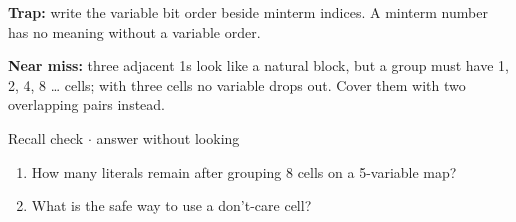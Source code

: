 \documentclass[11pt]{article}
\begin{document}
\begin{keepsection}
\begin{notebox}\textbf{Trap:} write the variable bit order beside minterm indices. A minterm number has no meaning without a variable order.\end{notebox}

\begin{notebox}\textbf{Near miss:} three adjacent 1s look like a natural block, but a group must have 1, 2, 4, 8 … cells; with three cells no variable drops out. Cover them with two overlapping pairs instead.\end{notebox}

\begin{recallbox}{Recall check \ensuremath{\cdot} answer without looking}
\begin{enumerate}
\item How many literals remain after grouping 8 cells on a 5-variable map?
\item What is the safe way to use a don’t-care cell?
\end{enumerate}

\end{recallbox}
\end{keepsection}
\end{document}
